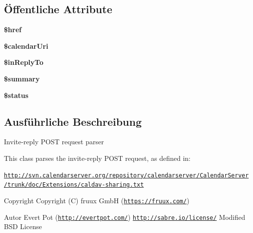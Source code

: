 \subsection*{Öffentliche Attribute}
\begin{DoxyCompactItemize}
\item 
\mbox{\label{class_sabre_1_1_cal_d_a_v_1_1_xml_1_1_request_1_1_invite_reply_a4f00beb117f23471a71300c7e49f0705}} 
{\bfseries \$href}
\item 
\mbox{\label{class_sabre_1_1_cal_d_a_v_1_1_xml_1_1_request_1_1_invite_reply_a643067702d3f6b4833609cd261b48c3f}} 
{\bfseries \$calendar\+Uri}
\item 
\mbox{\label{class_sabre_1_1_cal_d_a_v_1_1_xml_1_1_request_1_1_invite_reply_a350aac724bd8dd680430037886c9296c}} 
{\bfseries \$in\+Reply\+To}
\item 
\mbox{\label{class_sabre_1_1_cal_d_a_v_1_1_xml_1_1_request_1_1_invite_reply_a0d044ebfed35d80981f5cc6804c01a80}} 
{\bfseries \$summary}
\item 
\mbox{\label{class_sabre_1_1_cal_d_a_v_1_1_xml_1_1_request_1_1_invite_reply_a1f15ca39a3bbf61ef3600bbfc28d15cd}} 
{\bfseries \$status}
\end{DoxyCompactItemize}


\subsection{Ausführliche Beschreibung}
Invite-\/reply P\+O\+ST request parser

This class parses the invite-\/reply P\+O\+ST request, as defined in\+:

\href{http://svn.calendarserver.org/repository/calendarserver/CalendarServer/trunk/doc/Extensions/caldav-sharing.txt}{\tt http\+://svn.\+calendarserver.\+org/repository/calendarserver/\+Calendar\+Server/trunk/doc/\+Extensions/caldav-\/sharing.\+txt}

\begin{DoxyCopyright}{Copyright}
Copyright (C) fruux GmbH (\href{https://fruux.com/}{\tt https\+://fruux.\+com/}) 
\end{DoxyCopyright}
\begin{DoxyAuthor}{Autor}
Evert Pot (\href{http://evertpot.com/}{\tt http\+://evertpot.\+com/})  \href{http://sabre.io/license/}{\tt http\+://sabre.\+io/license/} Modified B\+SD License 
\end{DoxyAuthor}


